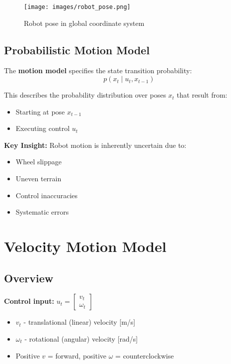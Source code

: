 \begin{figure}[H]
  \begin{center}
    \texttt{[image: images/robot\_pose.png]}
  \end{center}
  \caption{Robot pose in global coordinate system}
\end{figure}

\subsection{Probabilistic Motion Model}

The \textbf{motion model} specifies the state transition probability:
\begin{equation}
p(x_t \mid u_t, x_{t-1})
\end{equation}

This describes the probability distribution over poses $x_t$ that result from:
\begin{itemize}
    \item Starting at pose $x_{t-1}$
    \item Executing control $u_t$
\end{itemize}

\textbf{Key Insight:} Robot motion is inherently uncertain due to:
\begin{itemize}
    \item Wheel slippage
    \item Uneven terrain
    \item Control inaccuracies
    \item Systematic errors
\end{itemize}

\section{Velocity Motion Model}

\subsection{Overview}

\textbf{Control input:} $u_t = \begin{bmatrix} v_t \\ \omega_t \end{bmatrix}$
\begin{itemize}
    \item $v_t$ - translational (linear) velocity [m/s]
    \item $\omega_t$ - rotational (angular) velocity [rad/s]
    \item Positive $v$ = forward, positive $\omega$ = counterclockwise
\end{itemize}

